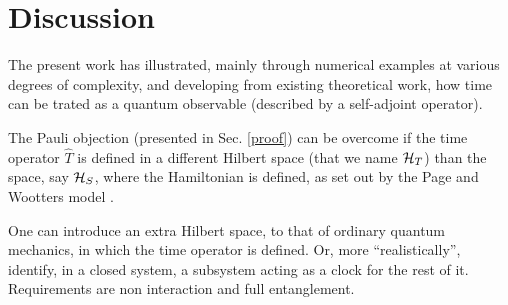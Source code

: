 \section{Discussion}

The present work has illustrated,
mainly through numerical examples
at various degrees of complexity,
and developing from existing theoretical work,
how time can be trated as a quantum observable
(described by a self-adjoint operator).

The Pauli objection (presented in Sec. \ref{proof})
can be overcome if the time operator $\hat{T}$
is defined in a different Hilbert space (that we name $\mathcal{H}_T$)
than the space, say $\mathcal{H}_S$, where the Hamiltonian is defined,
as set out by the Page and Wootters model
\parencite{PageWootters, Lloyd:Time, Marletto:Evolution, Maccone:QMOT, Maccone:Pauli}.

One can introduce an extra Hilbert space, to that of ordinary quantum mechanics,
in which the time operator is defined.
Or, more ``realistically'', identify, in a closed system, a subsystem
acting as a clock for the rest of it. Requirements are non interaction and
full entanglement.